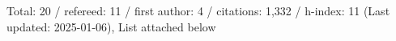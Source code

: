 Total: 20 / refereed: 11 / first author: 4 / citations: 1,332 / h-index: 11 (Last updated: 2025-01-06), List attached below